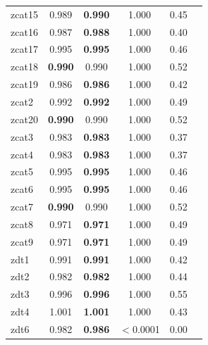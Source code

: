 \documentclass[journal]{IEEEtran}
\newcommand{\cmark}{\ding{51}}
\newcommand{\xmark}{\ding{55}}
\begin{document}
\begin{table}[htbp]
\begin{tabular}{lccccc}
zcat15 & 0.989 & \textbf{0.990} & 1.000 & 0.45 & \xmark \\
zcat16 & 0.987 & \textbf{0.988} & 1.000 & 0.40 & \xmark \\
zcat17 & 0.995 & \textbf{0.995} & 1.000 & 0.46 & \xmark \\
zcat18 & \textbf{0.990} & 0.990 & 1.000 & 0.52 & \xmark \\
zcat19 & 0.986 & \textbf{0.986} & 1.000 & 0.42 & \xmark \\
zcat2 & 0.992 & \textbf{0.992} & 1.000 & 0.49 & \xmark \\
zcat20 & \textbf{0.990} & 0.990 & 1.000 & 0.52 & \xmark \\
zcat3 & 0.983 & \textbf{0.983} & 1.000 & 0.37 & \xmark \\
zcat4 & 0.983 & \textbf{0.983} & 1.000 & 0.37 & \xmark \\
zcat5 & 0.995 & \textbf{0.995} & 1.000 & 0.46 & \xmark \\
zcat6 & 0.995 & \textbf{0.995} & 1.000 & 0.46 & \xmark \\
zcat7 & \textbf{0.990} & 0.990 & 1.000 & 0.52 & \xmark \\
zcat8 & 0.971 & \textbf{0.971} & 1.000 & 0.49 & \xmark \\
zcat9 & 0.971 & \textbf{0.971} & 1.000 & 0.49 & \xmark \\
zdt1 & 0.991 & \textbf{0.991} & 1.000 & 0.42 & \xmark \\
zdt2 & 0.982 & \textbf{0.982} & 1.000 & 0.44 & \xmark \\
zdt3 & 0.996 & \textbf{0.996} & 1.000 & 0.55 & \xmark \\
zdt4 & 1.001 & \textbf{1.001} & 1.000 & 0.43 & \xmark \\
zdt6 & 0.982 & \textbf{0.986} & $<$0.0001 & 0.00 & \cmark \\
\bottomrule
\end{tabular}
\end{table}
\end{document}
